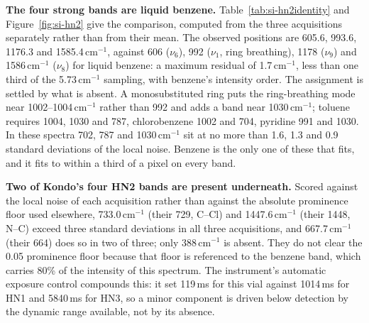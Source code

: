 \documentclass[11pt]{article}
\newcommand*\wn{\ensuremath{\text{cm}^{-1}}}
\begin{document}
\textbf{The four strong bands are liquid benzene.} Table~\ref{tab:si-hn2identity} and
Figure~\ref{fig:si-hn2} give the comparison, computed from the three acquisitions
separately rather than from their mean. The observed positions are 605.6, 993.6, 1176.3
and 1585.4\,\wn{}, against 606 ($\nu_6$), 992 ($\nu_1$, ring breathing), 1178 ($\nu_9$)
and 1586\,\wn{} ($\nu_8$) for liquid benzene: a maximum residual of 1.7\,\wn{}, less
than one third of the 5.73\,\wn{} sampling, with benzene's intensity order. The
assignment is settled by what is absent. A monosubstituted ring puts the ring-breathing
mode near 1002--1004\,\wn{} rather than 992 and adds a band near 1030\,\wn{}; toluene
requires 1004, 1030 and 787, chlorobenzene 1002 and 704, pyridine 991 and 1030. In these
spectra 702, 787 and 1030\,\wn{} sit at no more than 1.6, 1.3 and 0.9 standard deviations of the local
noise. Benzene is the only one of these that fits, and it fits to within a third of a
pixel on every band.

\textbf{Two of Kondo's four HN2 bands are present underneath.} Scored against the local
noise of each acquisition rather than against the absolute prominence floor used elsewhere,
733.0\,\wn{} (their 729, C--Cl) and 1447.6\,\wn{} (their 1448, N--C) exceed three
standard deviations in all three acquisitions, and 667.7\,\wn{} (their 664) does so in two
of three; only 388\,\wn{} is absent. They do not clear the 0.05 prominence floor because
that floor is referenced to the benzene band, which carries 80\% of the intensity of this
spectrum. The instrument's automatic exposure control compounds this: it set 119\,ms for
this vial against 1014\,ms for HN1 and 5840\,ms for HN3, so a minor component is driven
below detection by the dynamic range available, not by its absence.
\end{document}

